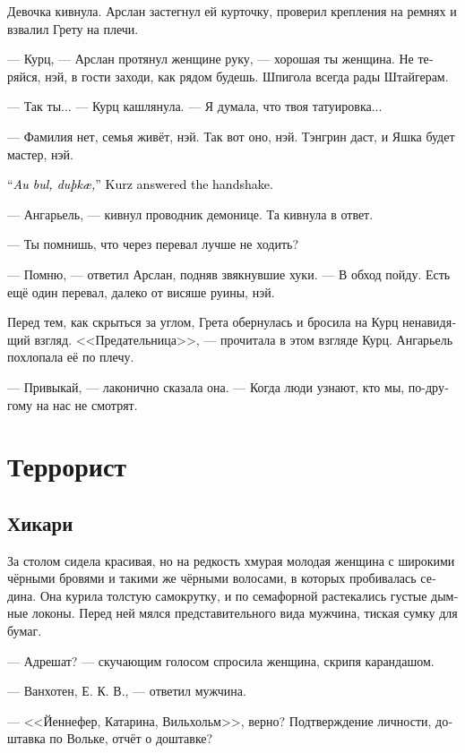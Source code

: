 \documentclass[a4paper,12pt,fleqn]{book}\usepackage{cooltooltips}\usepackage{polyglossia}\setdefaultlanguage[babelshorthands=true]{russian}\setotherlanguage{english}\defaultfontfeatures{Ligatures=TeX,Mapping=tex-text} \usepackage{xcolor}\definecolor{lightgray}{HTML}{bbbbbb}\color{lightgray}\newcommand{\ml}[3]{\textenglish{\textcolor{black}{#3}}}
\begin{document}
Девочка кивнула.
Арслан застегнул ей курточку, проверил крепления на ремнях и взвалил Грету на плечи.

--- Курц, --- Арслан протянул женщине руку, --- хорошая ты женщина.
Не теряйся, нэй, в гости заходи, как рядом будешь.
Шпигола всегда рады Штайгерам.

--- Так ты... --- Курц кашлянула.
--- Я думала, что твоя татуировка...

--- Фамилия нет, семья живёт, нэй.
Так вот оно, нэй.
Тэнгрин даст, и Яшка будет мастер, нэй.

\ml{$0$}
{--- Ау бул, дускай, --- Курц ответила на рукопожатие.}
{``\textit{Au bul, duþk\ae{},}'' Kurz answered the handshake.}

--- Ангарьель, --- кивнул проводник демонице.
Та кивнула в ответ.

--- Ты помнишь, что через перевал лучше не ходить?

--- Помню, --- ответил Арслан, подняв звякнувшие хуки.
--- В обход пойду.
Есть ещё один перевал, далеко от висяше руины, нэй.

Перед тем, как скрыться за углом, Грета обернулась и бросила на Курц ненавидящий взгляд.
<<Предательница>>, --- прочитала в этом взгляде Курц.
Ангарьель похлопала её по плечу.

--- Привыкай, --- лаконично сказала она.
--- Когда люди узнают, кто мы, по-другому на нас не смотрят.

\chapter{Террорист}

\section{Хикари}

За столом сидела красивая, но на редкость хмурая молодая женщина с широкими чёрными бровями и такими же чёрными волосами, в которых пробивалась седина.
Она курила толстую самокрутку, и по семафорной растекались густые дымные локоны.
Перед ней мялся представительного вида мужчина, тиская сумку для бумаг.

--- Адрешат? --- скучающим голосом спросила женщина, скрипя карандашом.

--- Ванхотен, Е. К. В., --- ответил мужчина.

--- <<Йеннефер, Катарина, Вильхольм>>, верно?
Подтверждение личности, доштавка по Вольке, отчёт о доштавке?
\end{document}
